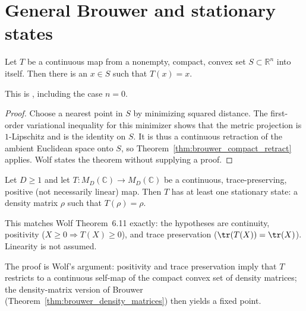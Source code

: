 \section{General Brouwer and stationary states}

\begin{theorem}
    \label{thm:brouwer_compact_convex}
    \leanok
    Let $T$ be a continuous map from a nonempty, compact, convex set
    $S\subset\mathbb{R}^n$ into itself. Then there is an $x\in S$ such that
    $T(x)=x$.

    This is \cite[Theorem~6.10]{Wolf2012Quantum}, including the case $n=0$.
\end{theorem}

\begin{proof}
    \leanok
    Choose a nearest point in $S$ by minimizing squared distance. The
    first-order variational inequality for this minimizer shows that the
    metric projection is $1$-Lipschitz and is the identity on $S$. It is thus
    a continuous retraction of the ambient Euclidean space onto $S$, so
    Theorem~\ref{thm:brouwer_compact_retract} applies. Wolf states the theorem
    without supplying a proof.
\end{proof}

\begin{theorem}\label{thm:stationary_states}
    \leanok
    Let $D\ge 1$ and let $T\colon M_D(\mathbb C)\to M_D(\mathbb C)$ be a
    continuous, trace-preserving, positive (not necessarily linear) map.
    Then $T$ has at least one stationary state: a density matrix $\rho$
    such that $T(\rho)=\rho$.

    This matches Wolf Theorem~6.11 exactly: the hypotheses are continuity,
    positivity ($X\geq0\Rightarrow T(X)\geq0$), and trace preservation
    ($\tr(T(X))=\tr(X)$).  Linearity is not assumed.

    The proof is Wolf's argument: positivity and trace preservation imply that
    $T$ restricts to a continuous self-map of the compact convex set of
    density matrices; the density-matrix version of Brouwer
    (Theorem~\ref{thm:brouwer_density_matrices}) then yields a fixed point.
\end{theorem}

